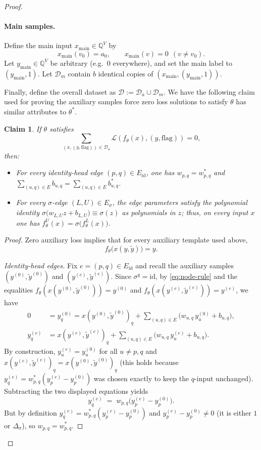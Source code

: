 \documentclass{article}
\newcommand{\Q}{\mathbb{Q}}
\newcommand{\cL}{\mathcal{L}}
\newcommand{\cD}{\mathcal{D}}
\theoremstyle{plain}
\newtheorem{claim}[theorem]{Claim}
\theoremstyle{definition}
\theoremstyle{remark}
\begin{document}
\begin{proof}
	
	\paragraph{Main samples.}
	Define the main input $x_{\mathrm{main}}\in\Q^{V}$ by
	\[
	x_{\mathrm{main}}(v_0)=a_0,\qquad x_{\mathrm{main}}(v)=0\ \ (v\neq v_0).
	\]
	Let $y_{\mathrm{main}}\in\Q^{V}$ be arbitrary (e.g.\ $0$ everywhere), and set the main label to $(y_{\mathrm{main}},1)$.
	Let $\cD_m$ contain $b$ identical copies of $(x_{\mathrm{main}},(y_{\mathrm{main}},1))$.
	
	\smallskip
	Finally, define the overall dataset as $\cD:=\cD_a\cup\cD_m$. We have the following claim used for proving the auxiliary samples force zero loss solutions to satisfy $\theta$ has similar attributes to  $\theta^*$. 
	


\begin{claim}\label{clm:force-all-trainable}
	If $\theta$ satisfies 
	\[\sum_{(x,(y,\mathrm{flag}))\in\cD_a}\cL(f_\theta(x),(y,\mathrm{flag}))=0,\]
	then:
	\begin{itemize}
		\item For every identity-head edge $(p,q)\in E_{\mathrm{id}}$, one has $w_{p,q}=w^\ast_{p,q}$ and
		$\sum_{(u,q)\in E} b_{u,q}=\sum_{(u,q)\in E} b^\ast_{u,q}$.
		\item For every $\sigma$-edge $(L,U)\in E_\sigma$, the edge parameters satisfy the polynomial identity
		$
		\sigma\bigl(w_{L,U}z+b_{L,U}\bigr)\equiv \sigma(z)
		$
		as polynomials in $z$; thus, on every input $x$ one has $f^U_\theta(x)=\sigma\!\bigl(f^L_\theta(x)\bigr)$.
	\end{itemize}
\end{claim}
\begin{proof}
	Zero auxiliary loss implies that for every auxiliary template used above,
	\[
	f_\theta\bigl(x(y,\tilde y)\bigr)=y.
	\]
	
	\smallskip
	\noindent\emph{Identity-head edges.}
	Fix $e=(p,q)\in E_{\mathrm{id}}$ and recall the auxiliary samples $(y^{(0)},\tilde y^{(0)})$ and $(y^{(e)},\tilde y^{(e)})$.
	Since $\sigma^q=\mathrm{id}$, by \eqref{eq:node-rule} and the equalities
	$f_\theta(x(y^{(0)},\tilde y^{(0)}))=y^{(0)}$ and $f_\theta(x(y^{(e)},\tilde y^{(e)}))=y^{(e)}$, we have
	\begin{align*}
		0
		&= y^{(0)}_q
		= x(y^{(0)},\tilde y^{(0)})_q + \sum_{(u,q)\in E}\bigl(w_{u,q}\,y^{(0)}_u+b_{u,q}\bigr),\\
		y^{(e)}_q
		&= x(y^{(e)},\tilde y^{(e)})_q + \sum_{(u,q)\in E}\bigl(w_{u,q}\,y^{(e)}_u+b_{u,q}\bigr).
	\end{align*}
	By construction, $y^{(e)}_u=y^{(0)}_u$ for all $u\neq p,q$ and
	$x(y^{(e)},\tilde y^{(e)})_q=x(y^{(0)},\tilde y^{(0)})_q$
	(this holds because $y^{(e)}_q=w^\ast_{p,q}(y^{(e)}_p-y^{(0)}_p)$ was chosen exactly to keep the $q$-input unchanged).
	Subtracting the two displayed equations yields
	\[
	y^{(e)}_q \;=\; w_{p,q}\bigl(y^{(e)}_p-y^{(0)}_p\bigr).
	\]
	But by definition $y^{(e)}_q=w^\ast_{p,q}(y^{(e)}_p-y^{(0)}_p)$ and $y^{(e)}_p-y^{(0)}_p\neq 0$ (it is either $1$ or $\Delta_\sigma$), so
	$w_{p,q}=w^\ast_{p,q}$.
	

\end{proof}
\end{proof}
\end{document}
